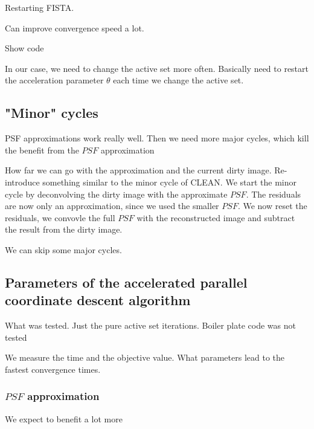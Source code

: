 Restarting FISTA.

Can improve convergence speed a lot.

Show code

In our case, we need to change the active set more often. Basically need to restart the acceleration parameter $\theta$ each time we change the active set.


\subsection{"Minor" cycles}
PSF approximations work really well.
Then we need more major cycles, which kill the benefit from the $PSF$ approximation

How far we can go with the approximation and the current dirty image.
Re-introduce something similar to the minor cycle of CLEAN. We start the minor cycle by deconvolving the dirty image with the approximate $PSF$. The residuals are now only an approximation, since we used the smaller $PSF$. We now reset the residuals, we convovle the full $PSF$ with the reconstructed image and subtract the result from the dirty image.

We can skip some major cycles.


\subsection{Parameters of the accelerated parallel coordinate descent algorithm}
What was tested.
Just the pure active set iterations. Boiler plate code was not tested

We measure the time and the objective value. What parameters lead to the fastest convergence times.


\subsubsection{$PSF$ approximation}
We expect to benefit a lot more

